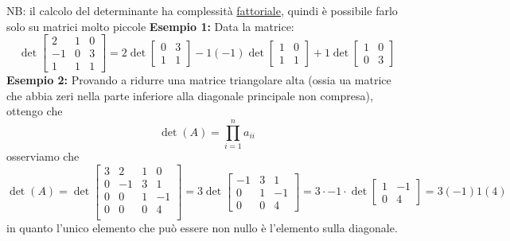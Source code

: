 \documentclass[12pt,a4paper,oneside]{article}
\begin{document}
NB: il calcolo del determinante ha complessità \underline{fattoriale}, quindi è possibile farlo solo su matrici molto piccole
\vskip3mm
\textbf{Esempio 1:}
Data la matrice:
\[
	\det
	\begin{bmatrix}
		2  & 1 & 0 \\
		-1 & 0 & 3 \\
		1  & 1 & 1
	\end{bmatrix}
	=2 \det\begin{bmatrix} 0&3 \\1 & 1  \end{bmatrix} -1\left( -1 \right) \det\begin{bmatrix} 1&0\\1 &1 \end{bmatrix} +1\det\begin{bmatrix} 1&0\\0&3 \end{bmatrix}
\]
\textbf{Esempio 2:}
Provando a ridurre una matrice triangolare alta (ossia ua matrice che abbia zeri nella parte inferiore alla diagonale principale non compresa), ottengo che
\[
	\det(A) = \prod_{i=1}^{n}  a_{ii}
\]
osserviamo che
\[
	\det\left( A \right) = \det
	\begin{bmatrix}
		3 & 2  & 1 & 0  \\
		0 & -1 & 3 & 1  \\
		0 & 0  & 1 & -1 \\
		0 & 0  & 0 & 4  \\
	\end{bmatrix}
	= 3 \det
	\begin{bmatrix}
		-1 & 3 & 1  \\
		0  & 1 & -1 \\
		0  & 0 & 4
	\end{bmatrix}
	=3 \cdot -1 \cdot \det
	\begin{bmatrix}
		1 & -1 \\
		0 & 4
	\end{bmatrix}
	= 3 \left( -1 \right) 1\left( 4 \right)
\]
in quanto l'unico elemento che può essere non nullo è l'elemento sulla diagonale.
\end{document}
